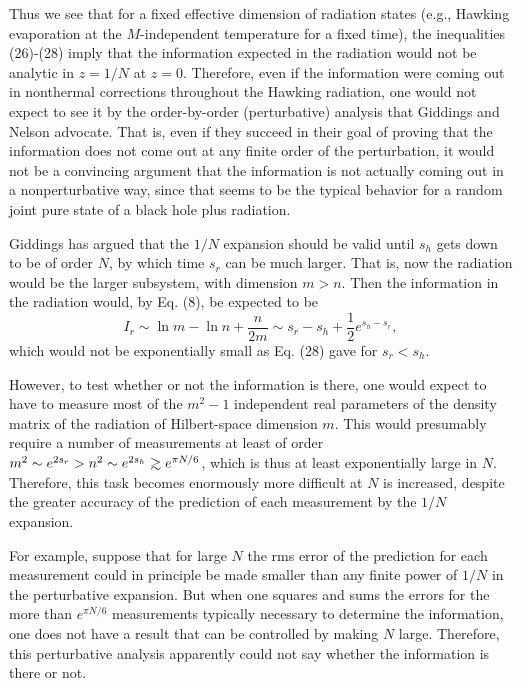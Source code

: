 	Thus we see that for a fixed effective dimension
of radiation states (e.g., Hawking evaporation at the
$M$-independent temperature for a fixed time),
the inequalities (26)-(28) imply that the information
expected in the radiation would not be analytic in
$z=1/N$ at $z=0$.  Therefore, even if the information
were coming out in nonthermal corrections throughout
the Hawking radiation, one would not expect to see it
by the order-by-order (perturbative) analysis that
Giddings and Nelson advocate.  That is, even if they
succeed in their goal of proving that the information
does not come out at any finite order of the perturbation,
it would not be a convincing argument that the information
is not actually coming out in a nonperturbative way,
since that seems to be the typical behavior for
a random joint pure state of a black hole plus radiation.

	Giddings has argued \cite{Gidpri} that the $1/N$
expansion should be valid until $s_h$ gets down to be
of order $N$, by which time $s_r$ can be much larger.
That is, now the radiation would be the larger subsystem,
with dimension $m>n$. Then the information in the
radiation would, by Eq. (8), be expected to be
	\begin{equation}
	I_r\sim\ln m - \ln n + \frac{n}{2m}\sim
	s_r - s_h + \frac{1}{2}e^{s_h-s_r},
	\end{equation}
which would not be exponentially small as Eq. (28) gave
for $s_r<s_h$.

	However, to test whether or not the information is there,
one would expect to have to measure most of the $m^2-1$
independent real parameters of the density matrix of the
radiation of Hilbert-space dimension $m$.  This would
presumably require a number of measurements at least of
order $m^2\sim e^{2s_r}>n^2\sim e^{2s_h}
{\;\raise.3ex\hbox{$>$\kern-.75em\lower1ex\hbox{$\sim$}}\;}
e^{\pi N/6}$,
which is thus at least exponentially large in $N$.
Therefore, this task becomes enormously more difficult
at $N$ is increased, despite the greater accuracy of the
prediction of each measurement by the $1/N$ expansion.

	For example, suppose that for large $N$ the rms
error of the prediction for each measurement could in
principle be made smaller than any finite power of $1/N$
in the perturbative expansion.  But when one squares
and sums the errors for the more than $e^{\pi N/6}$
measurements typically necessary to determine the
information, one does not have a result that can be
controlled by making $N$ large.  Therefore, this
perturbative analysis apparently could not say
whether the information is there or not.

